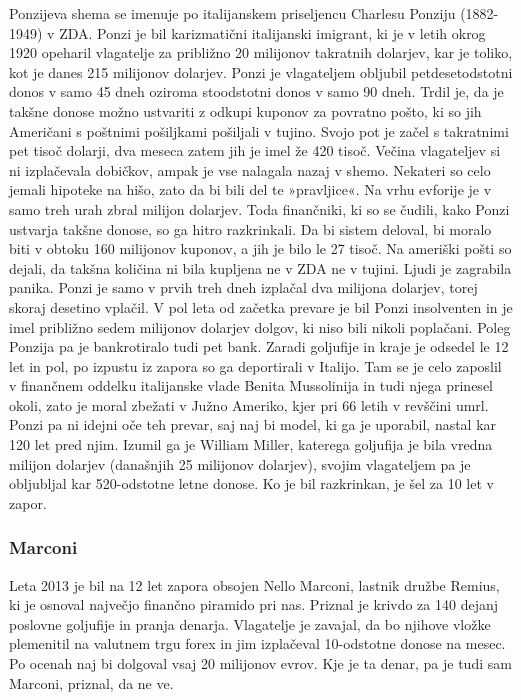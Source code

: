 \documentclass[letterpaper, titlepage, freqn]{article}
\begin{document}
Ponzijeva shema se imenuje po italijanskem priseljencu Charlesu Ponziju (1882-1949) v ZDA. Ponzi je bil karizmatični italijanski imigrant, ki je v letih okrog 1920 opeharil vlagatelje za približno 20 milijonov takratnih dolarjev, kar je toliko, kot je danes 215 milijonov dolarjev. Ponzi je vlagateljem obljubil petdesetodstotni donos v samo 45 dneh oziroma stoodstotni donos v samo 90 dneh. Trdil je, da je takšne donose možno ustvariti z odkupi kuponov za povratno pošto, ki so jih Američani s poštnimi pošiljkami pošiljali v tujino. Svojo pot je začel s takratnimi pet tisoč dolarji, dva meseca zatem jih je imel že 420 tisoč. Večina vlagateljev si ni izplačevala dobičkov, ampak je vse nalagala nazaj v shemo. Nekateri so celo jemali hipoteke na hišo, zato da bi bili del te »pravljice«. Na vrhu evforije je v samo treh urah zbral milijon dolarjev. Toda finančniki, ki so se čudili, kako Ponzi ustvarja takšne donose, so ga hitro razkrinkali. Da bi sistem deloval, bi moralo biti v obtoku 160 milijonov kuponov, a jih je bilo le 27 tisoč. Na ameriški pošti so dejali, da takšna količina ni bila kupljena ne v ZDA ne v tujini. Ljudi je zagrabila panika. Ponzi je samo v prvih treh dneh izplačal dva milijona dolarjev, torej skoraj desetino vplačil. V pol leta od začetka prevare je bil Ponzi insolventen in je imel približno sedem milijonov dolarjev dolgov, ki niso bili nikoli poplačani. Poleg Ponzija pa je bankrotiralo tudi pet bank. Zaradi goljufije in kraje je odsedel le 12 let in pol, po izpustu iz zapora so ga deportirali v Italijo. Tam se je celo zaposlil v finančnem oddelku italijanske vlade Benita Mussolinija in tudi njega prinesel okoli, zato je moral zbežati v Južno Ameriko, kjer pri 66 letih v revščini umrl.
Ponzi pa ni idejni oče teh prevar, saj naj bi model, ki ga je uporabil, nastal kar 120 let pred njim. Izumil ga je William Miller, katerega goljufija je bila vredna milijon dolarjev (današnjih 25 milijonov dolarjev), svojim vlagateljem pa je obljubljal kar 520-odstotne letne donose. Ko je bil razkrinkan, je šel za 10 let v zapor.

\subsubsection{Marconi}
Leta 2013 je bil na 12 let zapora obsojen Nello Marconi, lastnik družbe Remius, ki je osnoval največjo finančno piramido pri nas. Priznal je krivdo za 140 dejanj poslovne goljufije in pranja denarja. Vlagatelje je zavajal, da bo njihove vložke plemenitil na valutnem trgu forex in jim izplačeval 10-odstotne donose na mesec. Po ocenah naj bi dolgoval vsaj 20 milijonov evrov. Kje je ta denar, pa je tudi sam Marconi, priznal, da ne ve.
\end{document}
